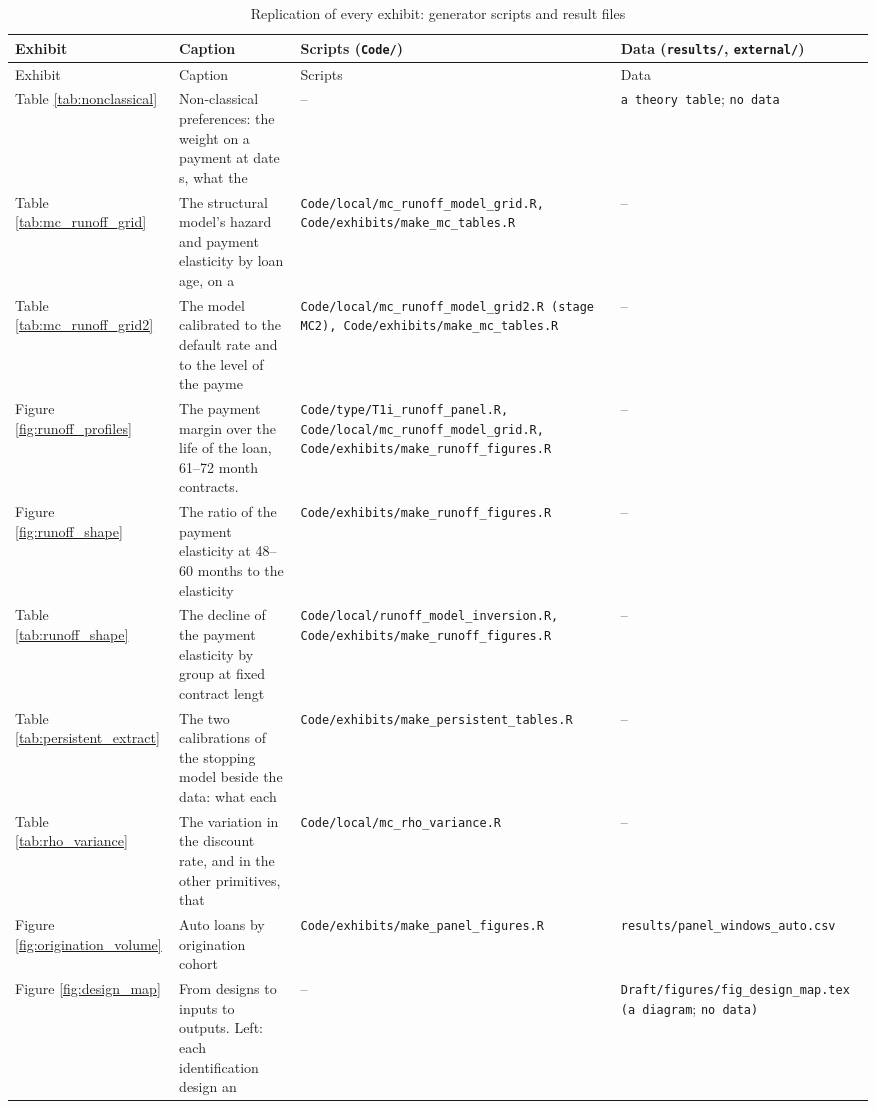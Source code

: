 \begin{longtable}{@{}p{}p{}p{}p{}@{}}
\caption{Replication of every exhibit: generator scripts and result files}\label{tab:replication_map}\\
\toprule
Exhibit & Caption & Scripts (\texttt{Code/}) & Data (\texttt{results/}, \texttt{external/}) \\
\midrule
\endfirsthead
\toprule
Exhibit & Caption & Scripts & Data \\
\midrule
\endhead
\bottomrule
\endfoot
Table \ref{tab:nonclassical} & Non-classical preferences: the weight on a payment at date s, what the & -- & \texttt{a theory table}; \texttt{no data} \\
Table \ref{tab:mc_runoff_grid} & The structural model's hazard and payment elasticity by loan age, on a & \texttt{Code/local/mc\_runoff\_model\_grid.R, Code/exhibits/make\_mc\_tables.R} & -- \\
Table \ref{tab:mc_runoff_grid2} & The model calibrated to the default rate and to the level of the payme & \texttt{Code/local/mc\_runoff\_model\_grid2.R (stage MC2), Code/exhibits/make\_mc\_tables.R} & -- \\
Figure \ref{fig:runoff_profiles} & The payment margin over the life of the loan, 61--72 month contracts.  & \texttt{Code/type/T1i\_runoff\_panel.R, Code/local/mc\_runoff\_model\_grid.R, Code/exhibits/make\_runoff\_figures.R} & -- \\
Figure \ref{fig:runoff_shape} & The ratio of the payment elasticity at 48--60 months to the elasticity & \texttt{Code/exhibits/make\_runoff\_figures.R} & -- \\
Table \ref{tab:runoff_shape} & The decline of the payment elasticity by group at fixed contract lengt & \texttt{Code/local/runoff\_model\_inversion.R, Code/exhibits/make\_runoff\_figures.R} & -- \\
Table \ref{tab:persistent_extract} & The two calibrations of the stopping model beside the data: what each  & \texttt{Code/exhibits/make\_persistent\_tables.R} & -- \\
Table \ref{tab:rho_variance} & The variation in the discount rate, and in the other primitives, that  & \texttt{Code/local/mc\_rho\_variance.R} & -- \\
Figure \ref{fig:origination_volume} & Auto loans by origination cohort & \texttt{Code/exhibits/make\_panel\_figures.R} & \texttt{results/panel\_windows\_auto.csv} \\
Figure \ref{fig:design_map} & From designs to inputs to outputs. Left: each identification design an & -- & \texttt{Draft/figures/fig\_design\_map.tex (a diagram}; \texttt{no data)} \\

\end{longtable}
